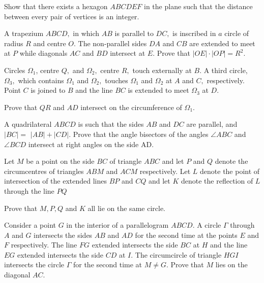 \documentclass{pset}
\begin{document}
\begin{problems}
\begin{problem}[IrMO 2020 Q10]
    Show that there exists a hexagon $A B C D E F$ in the plane such that the distance between every pair of vertices is an integer.
\end{problem}

\begin{problem}[IrMO 2020 Q9]
    A trapezium $A B C D,$ in which $A B$ is parallel to $D C,$ is inscribed in $a$ circle of radius $R$ and centre $O .$ The non-parallel sides $D A$ and $C B$ are extended to meet at $P$ while diagonals $A C$ and $B D$ intersect at $E .$ Prove that $|O E| \cdot|O P|=R^{2}$.
\end{problem}

\begin{problem}[IrMO 2020 Q3]
    Circles $\Omega_{1}$, centre $Q,$ and $\Omega_{2},$ centre $R,$ touch externally at $B .$ A third circle, $\Omega_{3},$ which contains $\Omega_{1}$ and $\Omega_{2},$ touches $\Omega_{1}$ and $\Omega_{2}$ at $A$ and $C,$ respectively. Point $C$ is joined to $B$ and the line $B C$ is extended to meet $\Omega_{3}$ at $D .$

    Prove that $Q R$ and $A D$ intersect on the circumference of $\Omega_{1}$.
\end{problem}

\begin{problem}[IrMO 2019 Q3]
    A quadrilateral \(A B C D\) is such that the sides \(A B\) and \(D C\) are parallel, and \(|B C|=\) \(|A B|+|C D| .\) Prove that the angle bisectors of the angles \(\angle A B C\) and \(\angle B C D\) intersect at right angles on the side AD.
\end{problem}


\begin{problem}[IrMO 2019 Q5]
    Let \(M\) be a point on the side \(B C\) of triangle \(A B C\) and let \(P\) and \(Q\) denote the circumcentres of triangles \(A B M\) and \(A C M\) respectively. Let \(L\) denote the point of intersection of the extended lines \(B P\) and \(C Q\) and let \(K\) denote the reflection of \(L\) through the line \(P Q\)
    
    Prove that \(M, P, Q\) and \(K\) all lie on the same circle.
\end{problem}

\begin{problem}[IrMO 2019 Q8]
    Consider a point \(G\) in the interior of a parallelogram \(A B C D .\) A circle \(\Gamma\) through \(A\) and \(G\) intersects the sides \(A B\) and \(A D\) for the second time at the points \(E\) and \(F\) respectively. The line \(F G\) extended intersects the side \(B C\) at \(H\) and the line \(E G\) extended intersects the side \(C D\) at \(I .\) The circumcircle of triangle \(H G I\) intersects the circle \(\Gamma\) for the second time at \(M \neq G .\) Prove that \(M\) lies on the diagonal \(A C\).
\end{problem}



\end{problems}
\end{document}
